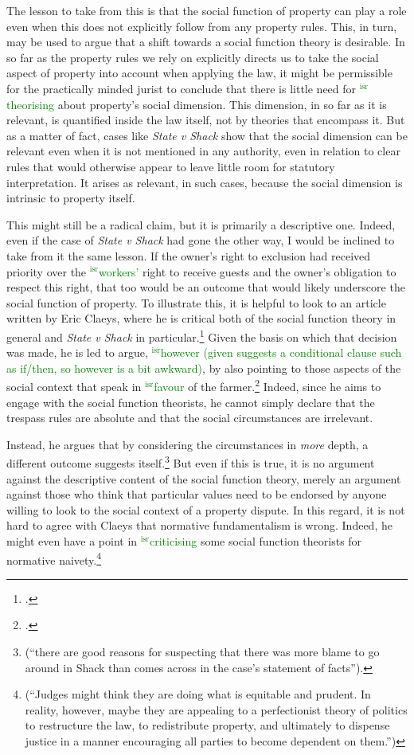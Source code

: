 \documentclass[12pt,a4paper]{book} %
\newcommand{\isr}[1]{\textcolor{green}{$^{\textrm{isr}}${#1}}}
\begin{document}
The lesson to take from this is that the social function of property can play a role even when this does not explicitly follow from any property rules. This, in turn, may be used to argue that a shift towards a social function theory is desirable. In so far as the property rules we rely on explicitly directs us to take the social aspect of property into account when applying the law, it might be permissible for the practically minded jurist to conclude that there is little need for \isr{theorising} about property's social dimension. This dimension, in so far as it is relevant, is quantified inside the law itself, not by theories that encompass it. But as a matter of fact, cases like {\it State v Shack} show that the social dimension can be relevant even when it is not mentioned in any authority, even in relation to clear rules that would otherwise appear to leave little room for statutory interpretation. It arises as relevant, in such cases, because the social dimension is intrinsic to property itself. 

This might still be a radical claim, but it is primarily a descriptive one. Indeed, even if the case of {\it State v Shack} had gone the other way, I would be inclined to take from it the same lesson. If the owner's right to exclusion had received priority over the \isr{workers'} right to receive guests and the owner's obligation to respect this right, that too would be an outcome that would likely underscore the social function of property. To illustrate this, it is helpful to look to an article written by Eric Claeys, where he is critical both of the social function theory in general and {\it State v Shack} in particular.\footcite{claeys09} Given the basis on which that decision was made, he is led to argue, \isr{however (given suggests a conditional clause such as if/then, so however is a bit awkward)}, by also pointing to those aspects of the social context that speak in \isr{favour} of the farmer.\footnote{\cite[941-942]{claeys09}.} Indeed, since he aims to engage with the social function theorists, he cannot simply declare  that the trespass rules are absolute and that the social circumstances are irrelevant. 

Instead, he argues that by considering the circumstances in {\it more} depth, a different outcome suggests itself.\footnote{\cite[941]{claeys09} (``there are good reasons for suspecting that there was more blame to go around in Shack than comes across in the case's statement of facts'').} But even if this is true, it is no argument against the descriptive content of the social function theory, merely an argument against those who think that particular values need to be endorsed by anyone willing to look to the social context of a property dispute. In this regard, it is not hard to agree with Claeys that normative fundamentalism is wrong. Indeed, he might even have a point in \isr{criticising} some social function theorists for normative naivety.\footnote{\cite[945]{claeys09} (``Judges might think they are doing what is equitable and prudent. In reality, however, maybe
they are appealing to a perfectionist theory of politics to restructure the law, to redistribute property, and ultimately to dispense justice in a manner encouraging all parties to become dependent on them.'')} 
\end{document}
